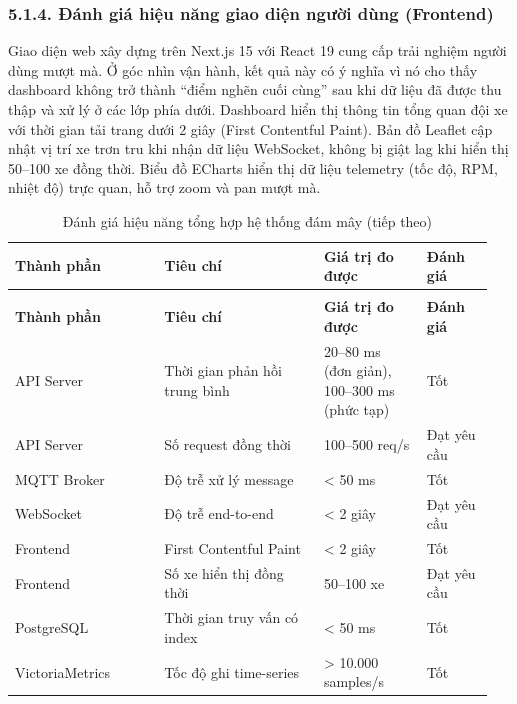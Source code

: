 \documentclass[a4paper]{extarticle}
\newcommand{\thesissettableid}[2]{%
  \renewcommand{\thetable}{#1}%
  \renewcommand{\theHtable}{#2}%
}
\begin{document}
\subsubsection{5.1.4. Đánh giá hiệu năng giao diện người dùng
(Frontend)}\label{514-ux111uxe1nh-giuxe1-hiux1ec7u-nux103ng-giao-diux1ec7n-ngux1b0ux1eddi-duxf9ng-frontend}

Giao diện web xây dựng trên Next.js 15 với React 19 cung cấp trải nghiệm
người dùng mượt mà. Ở góc nhìn vận hành, kết quả này có ý nghĩa vì nó
cho thấy dashboard không trở thành ``điểm nghẽn cuối cùng'' sau khi dữ
liệu đã được thu thập và xử lý ở các lớp phía dưới. Dashboard hiển thị
thông tin tổng quan đội xe với thời gian tải trang dưới 2 giây (First
Contentful Paint). Bản đồ Leaflet cập nhật vị trí xe trơn tru khi nhận
dữ liệu WebSocket, không bị giật lag khi hiển thị 50--100 xe đồng thời.
Biểu đồ ECharts hiển thị dữ liệu telemetry (tốc độ, RPM, nhiệt độ) trực
quan, hỗ trợ zoom và pan mượt mà.


{\thesissettableid{5.3}{tab-ch5-anh-gia-hieu-nang-tong-hop-he-thong-am-may}
\def\LTcaptype{table}
\begin{longtable}{|L{0.293\linewidth}|L{0.319\linewidth}|L{0.207\linewidth}|L{0.134\linewidth}|}
\caption{Đánh giá hiệu năng tổng hợp hệ thống đám mây}\label{tab:ch5-anh-gia-hieu-nang-tong-hop-he-thong-am-may}\\
\hline \textbf{Thành phần} & \textbf{Tiêu chí} & \textbf{Giá trị đo được} & \textbf{Đánh giá} \\
\hline
\endfirsthead
\caption[]{Đánh giá hiệu năng tổng hợp hệ thống đám mây (tiếp theo)}\\
\hline \textbf{Thành phần} & \textbf{Tiêu chí} & \textbf{Giá trị đo được} & \textbf{Đánh giá} \\
\hline
\endhead
\hline
\endfoot
\endlastfoot
API Server & Thời gian phản hồi trung bình & 20--80 ms (đơn giản),
100--300 ms (phức tạp) & Tốt \\\hline
API Server & Số request đồng thời & 100--500 req/s & Đạt yêu cầu \\\hline
MQTT Broker & Độ trễ xử lý message & \textless{} 50 ms & Tốt \\\hline
WebSocket & Độ trễ end-to-end & \textless{} 2 giây & Đạt yêu cầu \\\hline
Frontend & First Contentful Paint & \textless{} 2 giây & Tốt \\\hline
Frontend & Số xe hiển thị đồng thời & 50--100 xe & Đạt yêu cầu \\\hline
PostgreSQL & Thời gian truy vấn có index & \textless{} 50 ms & Tốt \\\hline
VictoriaMetrics & Tốc độ ghi time-series & \textgreater{} 10.000
samples/s & Tốt \\\hline
\end{longtable}
}
\end{document}
